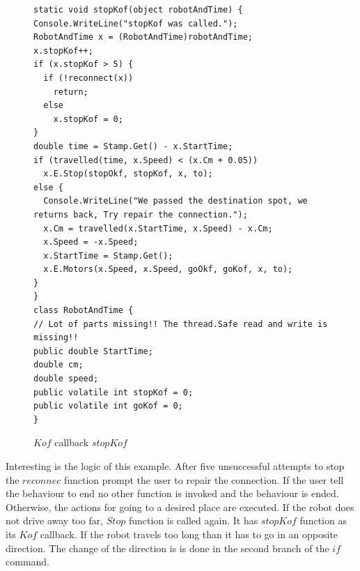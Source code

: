 \begin{figure}[!hbp]
\begin{lstlisting}
static void stopKof(object robotAndTime) {
Console.WriteLine("stopKof was called.");
RobotAndTime x = (RobotAndTime)robotAndTime;
x.stopKof++;
if (x.stopKof > 5) {
  if (!reconnect(x))
    return;
  else
    x.stopKof = 0;
}
double time = Stamp.Get() - x.StartTime;
if (travelled(time, x.Speed) < (x.Cm + 0.05))
  x.E.Stop(stopOkf, stopKof, x, to);
else {
  Console.WriteLine("We passed the destination spot, we returns back, Try repair the connection.");
  x.Cm = travelled(x.StartTime, x.Speed) - x.Cm;
  x.Speed = -x.Speed;
  x.StartTime = Stamp.Get();
  x.E.Motors(x.Speed, x.Speed, goOkf, goKof, x, to);
}
}
class RobotAndTime {
// Lot of parts missing!! The thread.Safe read and write is missing!!
public double StartTime;
double cm;
double speed;
public volatile int stopKof = 0;
public volatile int goKof = 0;
}

\end{lstlisting}
\caption{$Kof$ callback $stopKof$} \label{stopKof}
\end{figure}
  Interesting is the logic of this example. After five unsuccessful attempts to stop the $reconnec$ function
  prompt the user to repair the connection. 
  If the user tell the behaviour to end no other function is invoked and the behaviour is ended.
  Otherwise, the actions for going to a desired place are executed.
  If the robot does not drive away too far, $Stop$ function is called again.
  It has $stopKof$ function as its $Kof$ callback.
  If the robot travels too long than it has to go in an opposite direction.
  The change of the direction is is done in the second branch of the $if$ command.


